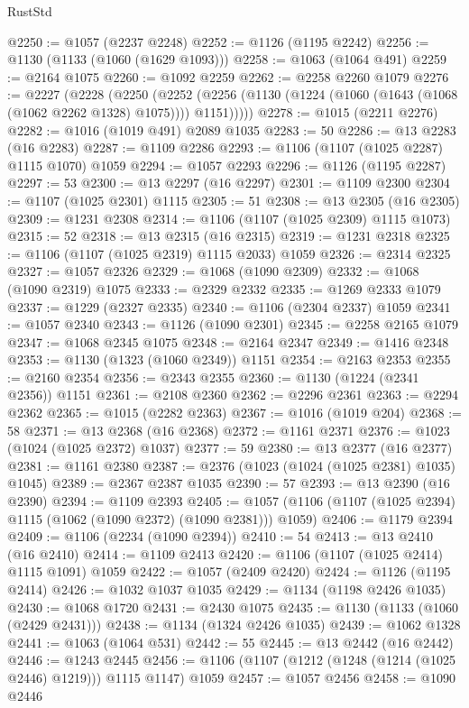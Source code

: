 \begin{lexlean}{RustStd}
\begin{coremodule}
{\begin{coremodule}
{{{{{{{{{{{{{{{{{{{{{{{{{{{{{{{{{{{@2250 := @1057 (@2237 @2248)
@2252 := @1126 (@1195 @2242)
@2256 := @1130 (@1133 (@1060 (@1629 @1093)))
@2258 := @1063 (@1064 @491)
@2259 := @2164 @1075
@2260 := @1092 @2259
@2262 := @2258 @2260 @1079
@2276 := @2227
    (@2228
      (@2250
        (@2252 (@2256 (@1130 (@1224 (@1060 (@1643 (@1068 (@1062 @2262 @1328) @1075)))) @1151)))))
@2278 := @1015 (@2211 @2276)
@2282 := @1016 (@1019 @491) @2089 @1035
@2283 := 50
@2286 := @13 @2283 (@16 @2283)
@2287 := @1109 @2286
@2293 := @1106 (@1107 (@1025 @2287) @1115 @1070) @1059
@2294 := @1057 @2293
@2296 := @1126 (@1195 @2287)
@2297 := 53
@2300 := @13 @2297 (@16 @2297)
@2301 := @1109 @2300
@2304 := @1107 (@1025 @2301) @1115
@2305 := 51
@2308 := @13 @2305 (@16 @2305)
@2309 := @1231 @2308
@2314 := @1106 (@1107 (@1025 @2309) @1115 @1073)
@2315 := 52
@2318 := @13 @2315 (@16 @2315)
@2319 := @1231 @2318
@2325 := @1106 (@1107 (@1025 @2319) @1115 @2033) @1059
@2326 := @2314 @2325
@2327 := @1057 @2326
@2329 := @1068 (@1090 @2309)
@2332 := @1068 (@1090 @2319) @1075
@2333 := @2329 @2332
@2335 := @1269 @2333 @1079
@2337 := @1229 (@2327 @2335)
@2340 := @1106 (@2304 @2337) @1059
@2341 := @1057 @2340
@2343 := @1126 (@1090 @2301)
@2345 := @2258 @2165 @1079
@2347 := @1068 @2345 @1075
@2348 := @2164 @2347
@2349 := @1416 @2348
@2353 := @1130 (@1323 (@1060 @2349)) @1151
@2354 := @2163 @2353
@2355 := @2160 @2354
@2356 := @2343 @2355
@2360 := @1130 (@1224 (@2341 @2356)) @1151
@2361 := @2108 @2360
@2362 := @2296 @2361
@2363 := @2294 @2362
@2365 := @1015 (@2282 @2363)
@2367 := @1016 (@1019 @204)
@2368 := 58
@2371 := @13 @2368 (@16 @2368)
@2372 := @1161 @2371
@2376 := @1023 (@1024 (@1025 @2372) @1037)
@2377 := 59
@2380 := @13 @2377 (@16 @2377)
@2381 := @1161 @2380
@2387 := @2376 (@1023 (@1024 (@1025 @2381) @1035) @1045)
@2389 := @2367 @2387 @1035
@2390 := 57
@2393 := @13 @2390 (@16 @2390)
@2394 := @1109 @2393
@2405 := @1057 (@1106 (@1107 (@1025 @2394) @1115 (@1062 (@1090 @2372) (@1090 @2381))) @1059)
@2406 := @1179 @2394
@2409 := @1106 (@2234 (@1090 @2394))
@2410 := 54
@2413 := @13 @2410 (@16 @2410)
@2414 := @1109 @2413
@2420 := @1106 (@1107 (@1025 @2414) @1115 @1091) @1059
@2422 := @1057 (@2409 @2420)
@2424 := @1126 (@1195 @2414)
@2426 := @1032 @1037 @1035
@2429 := @1134 (@1198 @2426 @1035)
@2430 := @1068 @1720
@2431 := @2430 @1075
@2435 := @1130 (@1133 (@1060 (@2429 @2431)))
@2438 := @1134 (@1324 @2426 @1035)
@2439 := @1062 @1328
@2441 := @1063 (@1064 @531)
@2442 := 55
@2445 := @13 @2442 (@16 @2442)
@2446 := @1243 @2445
@2456 := @1106 (@1107 (@1212 (@1248 (@1214 (@1025 @2446) @1219))) @1115 @1147) @1059
@2457 := @1057 @2456
@2458 := @1090 @2446
}}}}}}}}}}}}}}}}}}}}}}}}}}}}}}}}}}}
\end{coremodule}}
\end{coremodule}
\end{lexlean}
